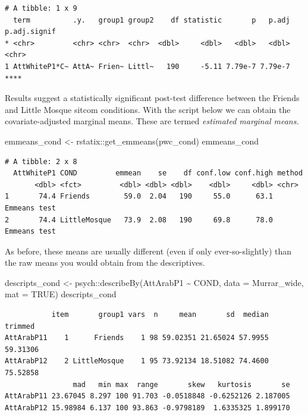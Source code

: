 \documentclass[
  11pt,
]{book}
\newenvironment{Shaded}{\begin{snugshade}}{\end{snugshade}}
\newcommand{\AttributeTok}[1]{\textcolor[rgb]{0.77,0.63,0.00}{#1}}
\newcommand{\ConstantTok}[1]{\textcolor[rgb]{0.00,0.00,0.00}{#1}}
\newcommand{\FunctionTok}[1]{\textcolor[rgb]{0.00,0.00,0.00}{#1}}
\newcommand{\NormalTok}[1]{#1}
\newcommand{\OtherTok}[1]{\textcolor[rgb]{0.56,0.35,0.01}{#1}}
\newcommand{\SpecialCharTok}[1]{\textcolor[rgb]{0.00,0.00,0.00}{#1}}
\begin{document}
\begin{verbatim}
# A tibble: 1 x 9
  term          .y.   group1 group2    df statistic       p   p.adj p.adj.signif
* <chr>         <chr> <chr>  <chr>  <dbl>     <dbl>   <dbl>   <dbl> <chr>       
1 AttWhiteP1*C~ AttA~ Frien~ Littl~   190     -5.11 7.79e-7 7.79e-7 ****        
\end{verbatim}

Results suggest a statistically significant post-test difference between the Friends and Little Mosque sitcom conditions.
With the script below we can obtain the covariate-adjusted marginal means. These are termed \emph{estimated marginal means.}

\begin{Shaded}
\begin{Highlighting}[]
\NormalTok{emmeans\_cond }\OtherTok{\textless{}{-}}\NormalTok{ rstatix}\SpecialCharTok{::}\FunctionTok{get\_emmeans}\NormalTok{(pwc\_cond)}
\NormalTok{emmeans\_cond}
\end{Highlighting}
\end{Shaded}

\begin{verbatim}
# A tibble: 2 x 8
  AttWhiteP1 COND         emmean    se    df conf.low conf.high method      
       <dbl> <fct>         <dbl> <dbl> <dbl>    <dbl>     <dbl> <chr>       
1       74.4 Friends        59.0  2.04   190     55.0      63.1 Emmeans test
2       74.4 LittleMosque   73.9  2.08   190     69.8      78.0 Emmeans test
\end{verbatim}

As before, these means are usually different (even if only ever-so-slightly) than the raw means you would obtain from the descriptives.

\begin{Shaded}
\begin{Highlighting}[]
\NormalTok{descripts\_cond }\OtherTok{\textless{}{-}}\NormalTok{ psych}\SpecialCharTok{::}\FunctionTok{describeBy}\NormalTok{(AttArabP1 }\SpecialCharTok{\textasciitilde{}}\NormalTok{ COND, }\AttributeTok{data =}\NormalTok{ Murrar\_wide,}
    \AttributeTok{mat =} \ConstantTok{TRUE}\NormalTok{)}
\NormalTok{descripts\_cond}
\end{Highlighting}
\end{Shaded}

\begin{verbatim}
           item       group1 vars  n     mean       sd  median  trimmed
AttArabP11    1      Friends    1 98 59.02351 21.65024 57.9955 59.31306
AttArabP12    2 LittleMosque    1 95 73.92134 18.51082 74.4600 75.52858
                mad   min max  range       skew   kurtosis       se
AttArabP11 23.67045 8.297 100 91.703 -0.0518848 -0.6252126 2.187005
AttArabP12 15.98984 6.137 100 93.863 -0.9798189  1.6335325 1.899170
\end{verbatim}
\end{document}
